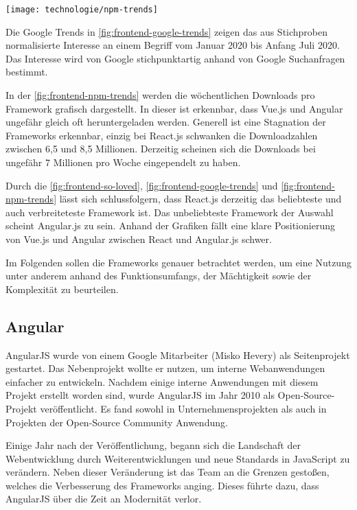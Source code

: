 \begin{center}
	\texttt{[image: technologie/npm-trends]}
	\label{fig:frontend-npm-trends}
\end{center}

Die Google Trends in \autoref{fig:frontend-google-trends} zeigen das aus Stichproben normalisierte Interesse an einem Begriff vom Januar 2020 bis Anfang Juli 2020. Das Interesse wird von Google stichpunktartig anhand von Google Suchanfragen bestimmt. \cite{googleHaufigGestellteFragen2020}

In der \autoref{fig:frontend-npm-trends} werden die wöchentlichen Downloads pro Framework grafisch dargestellt. In dieser ist erkennbar, dass Vue.js und Angular ungefähr gleich oft heruntergeladen werden. Generell ist eine Stagnation der Frameworks erkennbar, einzig bei React.js schwanken die Downloadzahlen zwischen 6,5 und 8,5 Millionen. Derzeitig scheinen sich die Downloads bei ungefähr 7 Millionen pro Woche eingependelt zu haben.

Durch die \autoref{fig:frontend-so-loved}, \autoref{fig:frontend-google-trends} und \autoref{fig:frontend-npm-trends} lässt sich schlussfolgern, dass React.js derzeitig das beliebteste und auch verbreiteteste Framework ist. Das unbeliebteste Framework der Auswahl scheint Angular.js zu sein. Anhand der Grafiken fällt eine klare Positionierung von Vue.js und Angular zwischen React und Angular.js schwer.

Im Folgenden sollen die Frameworks genauer betrachtet werden, um eine Nutzung unter anderem anhand des Funktionsumfangs, der Mächtigkeit sowie der Komplexität zu beurteilen.

\subsection{Angular}
AngularJS wurde von einem Google Mitarbeiter (Misko Hevery) als Seitenprojekt gestartet. Das Nebenprojekt wollte er nutzen, um interne Webanwendungen einfacher zu entwickeln. Nachdem einige interne Anwendungen mit diesem Projekt erstellt worden sind, wurde AngularJS im Jahr 2010 als Open-Source-Projekt veröffentlicht. Es fand sowohl in Unternehmensprojekten als auch in Projekten der Open-Source Community Anwendung. \cite{gaviganHistoryAngular2018}

Einige Jahr nach der Veröffentlichung, begann sich die Landschaft der Webentwicklung durch Weiterentwicklungen und neue Standards in JavaScript zu verändern. Neben dieser Veränderung ist das Team an die Grenzen gestoßen, welches die Verbesserung des Frameworks anging. Dieses führte dazu, dass AngularJS über die Zeit an Modernität verlor. \cite{gaviganHistoryAngular2018}

